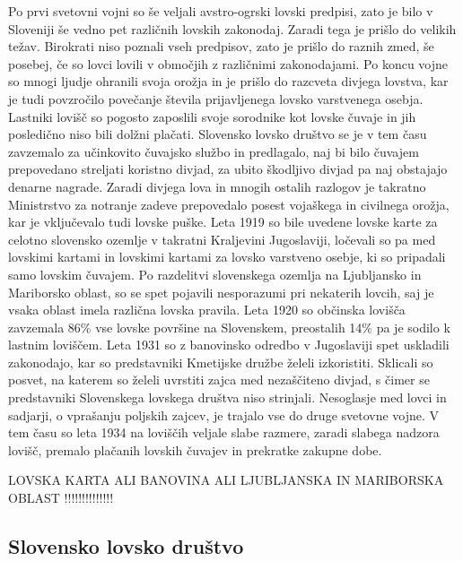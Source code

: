 \documentclass[a4paper,12pt,openright]{book}
\begin{document}
Po prvi svetovni vojni so še veljali avstro-ogrski lovski predpisi, zato je bilo v Sloveniji še vedno pet različnih lovskih zakonodaj. 
Zaradi tega je prišlo do velikih težav. 
Birokrati niso poznali vseh predpisov, zato je prišlo do raznih zmed, še posebej, če so lovci lovili v območjih z različnimi zakonodajami. 
Po koncu vojne so mnogi ljudje ohranili svoja orožja in je prišlo do razcveta divjega lovstva, kar je tudi povzročilo povečanje števila prijavljenega lovsko varstvenega osebja. Lastniki lovišč so pogosto zaposlili svoje sorodnike kot lovske čuvaje in jih posledično niso bili dolžni plačati. 
Slovensko lovsko društvo se je v tem času zavzemalo za učinkovito čuvajsko službo in predlagalo, naj bi bilo čuvajem prepovedano streljati koristno divjad, za ubito škodljivo divjad pa naj obstajajo denarne nagrade. 
Zaradi divjega lova in mnogih ostalih razlogov je takratno Ministrstvo za notranje zadeve prepovedalo posest vojaškega in civilnega orožja, kar je vključevalo tudi lovske puške.
Leta 1919 so bile uvedene lovske karte za celotno slovensko ozemlje v takratni Kraljevini Jugoslaviji, ločevali so pa med lovskimi kartami in lovskimi kartami za lovsko varstveno osebje, ki so pripadali samo lovskim čuvajem. 
Po razdelitvi slovenskega ozemlja na Ljubljansko in Mariborsko oblast, so se spet pojavili nesporazumi pri nekaterih lovcih, saj je vsaka oblast imela različna lovska pravila. Leta 1920 so občinska lovišča zavzemala 86\% vse lovske površine na Slovenskem, preostalih 14\% pa je sodilo k lastnim loviščem. 
Leta 1931 so z banovinsko odredbo v Jugoslaviji spet uskladili zakonodajo, kar so predstavniki Kmetijske družbe želeli izkoristiti. 
Sklicali so posvet, na katerem so želeli uvrstiti zajca med nezaščiteno divjad, s čimer se predstavniki Slovenskega lovskega društva niso strinjali. 
Nesoglasje med lovci in sadjarji, o vprašanju poljskih zajcev, je trajalo vse do druge svetovne vojne. 
V tem času so leta 1934 na loviščih veljale slabe razmere, zaradi slabega nadzora lovišč, premalo plačanih lovskih čuvajev in prekratke zakupne dobe.\cite{Lov_93_120}

LOVSKA KARTA ALI BANOVINA ALI LJUBLJANSKA IN MARIBORSKA OBLAST !!!!!!!!!!!!!!

\subsection{Slovensko lovsko društvo}
\end{document}
